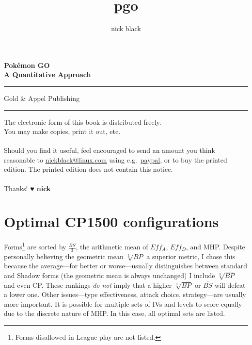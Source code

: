 \documentclass[ebook,10pt,openany,oneside]{memoir}
\title{pgo}
\author{nick black}
\def\LOGO {
  \textbf{
    \Huge Pokémon GO\\
    \Large A Quantitative Approach\\
  }}
\begin{document}
  \pagestyle{empty}
  \begin{center}
  \LOGO
  \vspace{0.5in}
  \end{center}
  \vfill\hrule
  \begin{center}\textsf{Gold \& Appel Publishing}\end{center}
  \hrule
  \clearpage
  \setcounter{page}{1}
  \pagestyle{plain} %

\clearpage
\vfill
\noindent{}The electronic form of this book is distributed freely.\\
You may make copies, print it out, etc.\\
\\
Should you find it useful, feel encouraged to send an amount you think reasonable to
  \href{mailto:nickblack@linux.com}{nickblack@linux.com} using
  e.g.\ \href{https://paypal.me/dankamongmen}{paypal},
  or to buy the printed edition.
The printed edition does not contain this notice.\\
\\
Thanks! {\textbf{{\symbolfont♥} nick}}
\clearpage
\ifdefined\epub
\else
  \hypertarget{toc}{}%
  \tableofcontents*
  \listoftables*
  \fi

%














\appendix
\chapter{Optimal CP1500 configurations}
\label{chap:optimal}
Forms\footnote{Forms disallowed in League play are not listed.} are sorted by $\frac{BS}{3}$,
  the arithmetic mean of $Eff_A$, $Eff_D$, and MHP\@.
Despite personally believing the geometric mean $\sqrt[3]{BP}$ a superior metric,
  I chose this because the average---for better or worse---usually
  distinguishes between standard and Shadow forms (the geometric mean is always unchanged)
I include $\sqrt[3]{BP}$ and even CP\@.
These rankings \textit{do not} imply that a higher $\sqrt[3]{BP}$ or $\overline{BS}$
  will defeat a lower one.
Other issues---type effectiveness, attack choice, strategy---are usually more important.
It is possible for multiple sets of IVs and levels to score equally due to the discrete nature of MHP\@.
In this case, all optimal sets are listed.
\end{document}
